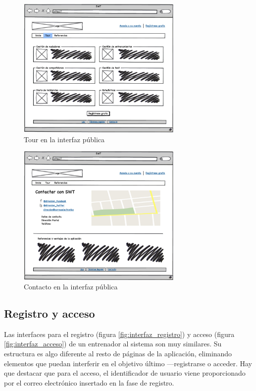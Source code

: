 		\begin{figure}[H]
		  \centering
		    \includegraphics[width=8cm]{./eps/p_interfaz/2_Tour.eps}
		  \caption{Tour en la interfaz pública}
		  \label{fig:interfaz_publica_tour}
		\end{figure}

		\begin{figure}[H]
		  \centering
		    \includegraphics[width=8cm]{./eps/p_interfaz/3_Contacto.eps}
		  \caption{Contacto en la interfaz pública}
		  \label{fig:interfaz_publica_contacto}
		\end{figure}

	
	\subsection{Registro y acceso} %
		\label{sub:registro_y_acceso}
	
		Las interfaces para el registro (figura \ref{fig:interfaz_registro}) y acceso (figura \ref{fig:interfaz_acceso}) de un entrenador al sistema son muy similares. Su estructura es algo diferente al resto de páginas de la aplicación, eliminando elementos que puedan interferir en el objetivo último ---registrarse o acceder. Hay que destacar que para el acceso, el identificador de usuario viene proporcionado por el correo electrónico insertado en la fase de registro.
		
